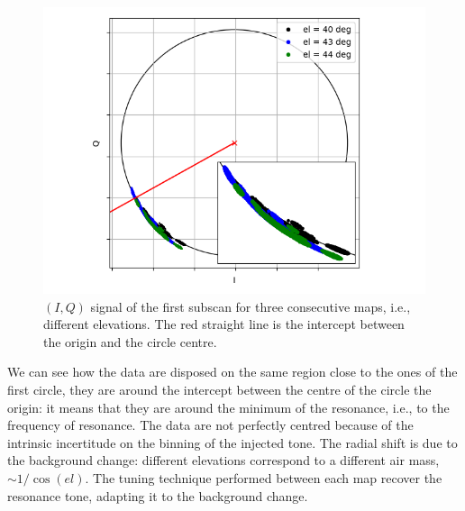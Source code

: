 \begin{figure}[htf]
	\centering
	\includegraphics[width=.5\textwidth]{4.results/autotuning.png}
	\caption{$(I,Q)$ signal of the first subscan for three consecutive maps, i.e., different elevations. The red straight line is the intercept between the origin and the circle centre.}
	\label{fig:autotuning}
\end{figure}

\noindent We can see how the data are disposed on the same region close to the ones of the first circle, they are around the intercept between the centre of the circle the origin: it means that they are around the minimum of the resonance, i.e., to the frequency of resonance. The data are not perfectly centred because of the intrinsic incertitude on the binning of the injected tone. The radial shift is due to the background change: different elevations correspond to a different air mass, $\sim 1/\cos(el)$. The tuning technique performed between each map recover the resonance  tone, adapting it to the background change.